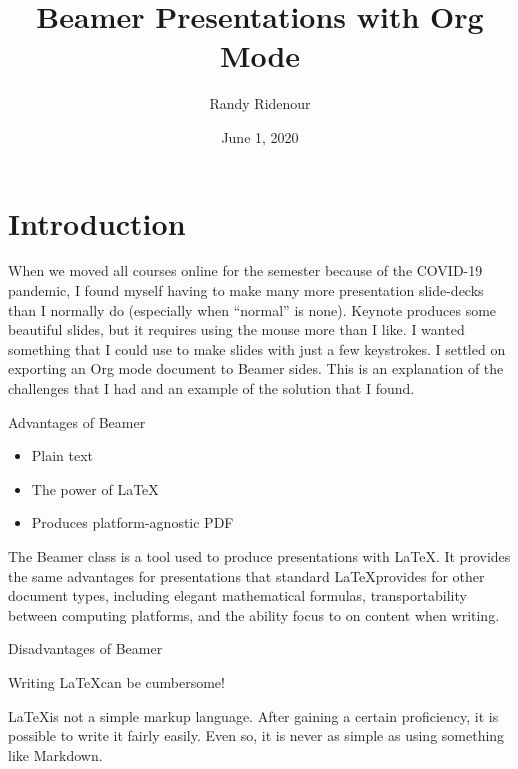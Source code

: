 \documentclass[aspectratio=169,12pt,ignorenonframetext]{beamer}
\author{Randy Ridenour}
\date{June  1, 2020}
\title{Beamer Presentations with Org Mode}
\institute[OBU]{Oklahoma Baptist University}
\begin{document}
\maketitle

\begin{frame}[label={sec:org05f12c1}]{}
\maketitle
\end{frame}

\begin{frame}[label={sec:org3e4f752}]{}
\tableofcontents
\end{frame}

\section{Introduction}
\label{sec:orgcfee2b3}

When we moved all courses online for the semester because of the COVID-19 pandemic, I found myself having to make many more presentation slide-decks than I normally do (especially when ``normal'' is none). Keynote produces some beautiful slides, but it requires using the mouse more than I like. I wanted something that I could use to make slides with just a few keystrokes. I settled on exporting an Org mode document to Beamer sides. This is an explanation of the challenges that I had and an example of the solution that I found.


\begin{frame}[label={sec:org116bbf5}]{Advantages of Beamer}
\begin{itemize}
\item Plain text
\item The power of \LaTeX
\item Produces platform-agnostic PDF
\end{itemize}
\end{frame}

The Beamer class is a tool used to produce presentations with \LaTeX. It provides the same advantages for presentations that standard \LaTeX provides for other document types, including elegant mathematical formulas, transportability between computing platforms, and the ability focus to on content when writing.


\begin{frame}[label={sec:org2c7731f}]{Disadvantages of Beamer}
\begin{center}
\alert{Writing \LaTeX can be cumbersome!}
\end{center}
\end{frame}
\LaTeX is not a simple markup language. After gaining a certain proficiency, it is possible to write it fairly easily. Even so, it is never as simple as using something like Markdown.
\end{document}
